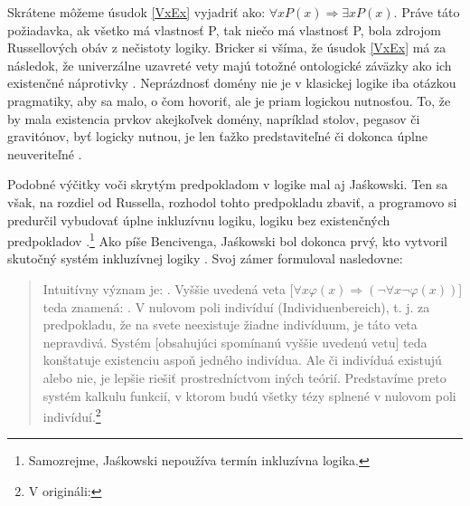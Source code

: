 \documentclass[12pt, letterpaper]{article}
\begin{document}
\noindent Skrátene môžeme úsudok \ref{VxEx} vyjadriť ako: $\forall x P(x) \Rightarrow \exists x P(x)$. Práve táto požiadavka, ak všetko má vlastnosť P, tak niečo má vlastnosť P, bola zdrojom Russellových obáv z nečistoty logiky. Bricker si všíma, že úsudok \ref{VxEx} má za následok, že univerzálne uzavreté vety majú totožné ontologické záväzky ako ich existenčné náprotivky \parencites[]{sep-ontological-commitment}. Neprázdnosť domény nie je v klasickej logike iba otázkou pragmatiky, aby sa malo, o čom hovoriť, ale je priam logickou nutnosťou. To, že by mala existencia prvkov akejkoľvek domény, napríklad stolov, pegasov či gravitónov, byť logicky nutnou, je len ťažko predstaviteľné či dokonca úplne neuveriteľné \parencites[183--184]{oliver_plural_2016}.\par
Podobné výčitky voči skrytým predpokladom v logike mal aj Jaśkowski.
Ten sa však, na rozdiel od Russella, rozhodol tohto predpokladu zbaviť, a programovo si predurčil vybudovať úplne inkluzívnu logiku, logiku bez existenčných predpokladov \parencites[254--255]{jaskowski}.\footnote{Samozrejme, Jaśkowski nepoužíva termín inkluzívna logika.} Ako píše Bencivenga, Jaśkowski bol dokonca prvý, kto vytvoril skutočný systém inkluzívnej logiky \parencites{bencivenga_jaskowski}. Svoj zámer formuloval nasledovne: 
\begin{center}
\begin{quote}

Intuitívny význam  je: . Vyššie uvedená veta [$\forall x \varphi(x) \Rightarrow (\neg\forall x \neg \varphi(x))$] teda znamená: . V nulovom poli indivíduí (Individuenbereich), t. j. za predpokladu, že na svete neexistuje žiadne indivíduum, je táto veta nepravdivá. Systém [obsahujúci spomínanú vyššie uvedenú vetu] teda konštatuje existenciu aspoň jedného indivídua. Ale či indivíduá existujú alebo nie, je lepšie riešiť prostredníctvom iných teórií. Predstavíme preto systém kalkulu funkcií, v ktorom budú všetky tézy splnené v nulovom poli indivíduí.\footnote{V origináli: }\parencite[vlastný preklad, aktualizovaná notácia,][254--255]{jaskowski}

\end{quote}
\end{center} 
\end{document}
